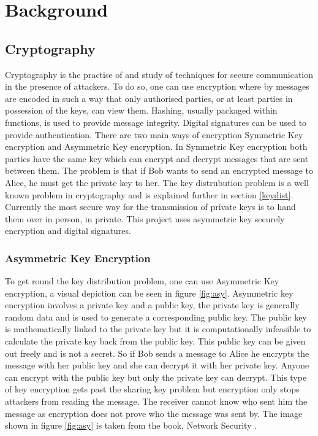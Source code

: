 
\chapter{Background}
\label{back}

\section{Cryptography}

Cryptography is the practise of and study of techniques for secure communication in the presence of attackers. To do so, one can use encryption where by messages are encoded in such a way that only authorised parties, or at least parties in possession of the keys, can view them. Hashing, usually packaged within functions, is used to provide message integrity. Digital signatures can be used to provide authentication. There are two main ways of encryption Symmetric Key encryption and Asymmetric Key encryption. In Symmetric Key encryption both parties have the same key which can encrypt and decrypt messages that are sent between them. The problem is that if Bob wants to send an encrypted message to Alice, he must get the private key to her. The key distrubution problem is a well known problem in cryptography and is explained further in section \ref{keydist}. Currently the most secure way for the transmission of private keys is to hand them over in person, in private. This project uses asymmetric key securely encryption and digital signatures.


\subsection{Asymmetric Key Encryption}

To get round the key distribution problem, one can use Asymmetric Key encryption, a visual depiction can be seen in figure \ref{fig:asy}. Asymmetric key encryption involves a private key and a public key, the private key is generally random data and is used to generate a corresponding public key. The public key is mathematically linked to the private key but it is computationally infeasible to calculate the private key back from the public key. This public key can be given out freely and is not a secret. So if Bob sends a message to Alice he encrypts the message with her public key and she can decrypt it with her private key. Anyone can encrypt with the public key but only the private key can decrypt. This type of key encryption gets past the sharing key problem but encryption only stops attackers from reading the message. The receiver cannot know who sent him the message as encryption does not prove who the message was sent by. The image shown in figure \ref{fig:asy} is taken from the book, Network Security \cite{NetworkSec}.

